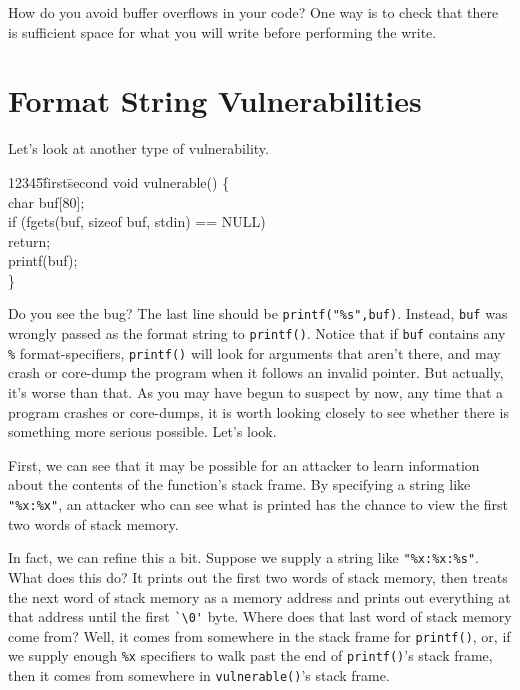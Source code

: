 \documentclass[11pt]{article}
\begin{document}
How do you avoid buffer
overflows in your code? One way is to check that there is sufficient
space for what you will write before performing the write.

\section{Format String Vulnerabilities}

Let's look at another type of vulnerability.

\begin{ttfamily}
\begin{tabbing}
12345\=first\=second \kill
void vulnerable() \{ \\
\>char buf[80]; \\
\>if (fgets(buf, sizeof buf, stdin) == NULL) \\
\>\>return; \\
\>printf(buf); \\
\} \\
\end{tabbing}
\end{ttfamily}

Do you see the bug? The last line should be
\texttt{printf("\%s",buf)}.  Instead, \texttt{buf} was wrongly passed
as the format string to \texttt{printf()}.  Notice that if
\texttt{buf} contains any \texttt{\%} format-specifiers, \texttt{printf()} will
look for arguments that aren't there, and may crash or core-dump the
program when it follows an invalid pointer. But actually, it's worse
than that. As you may have begun to suspect by now, any time that a
program crashes or core-dumps, it is worth looking closely to see
whether there is something more serious possible.  Let's look.

First, we can see that it may be possible for
an attacker to learn information about the contents of the function's
stack frame. By specifying a string like \texttt{"\%x:\%x"}, an attacker who can
see what is printed has the chance to view the first two words of
stack memory.  

In fact, we can refine this a bit. Suppose we supply a
string like \texttt{"\%x:\%x:\%s"}. What does this do? It prints out the first two
words of stack memory, then treats the next word of stack memory as a
memory address and prints out everything at that address until the
first \verb=`\0'= byte. 
Where does that last word of stack memory come from?
Well, it comes from somewhere in the stack frame for \texttt{printf()}, or, if
we supply enough \texttt{\%x} specifiers to walk past the end of 
\texttt{printf()}'s
stack frame, then it comes from somewhere in \texttt{vulnerable()}'s stack
frame.  
\end{document}
